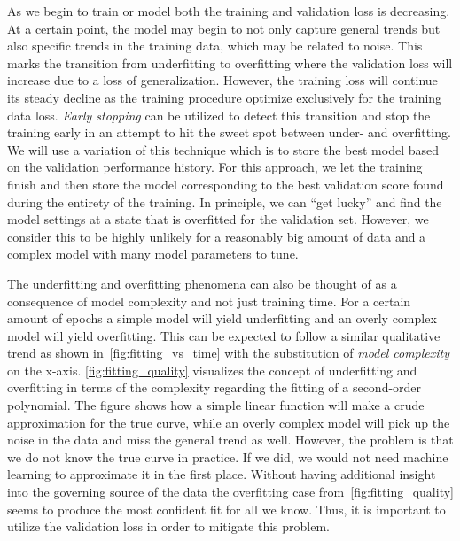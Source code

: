 As we begin to train or model both the training and validation loss is
decreasing. At a certain point, the model may begin to not only capture general
trends but also specific trends in the training data, which may be related to
noise. This marks the transition from underfitting to overfitting where the
validation loss will increase due to a loss of generalization. However, the
training loss will continue its steady decline as the training procedure
optimize exclusively for the training data loss. \textit{Early stopping} can be
utilized to detect this transition and stop the training early in an attempt to
hit the sweet spot between under- and overfitting. We will use a variation of
this technique which is to store the best model based on the validation
performance history. For this approach, we let the training finish and then
store the model corresponding to the best validation score found during the
entirety of the training. In principle, we can ``get lucky'' and find the model
settings at a state that is overfitted for the validation set. However, we
consider this to be highly unlikely for a reasonably big amount of data and a
complex model with many model parameters to tune.


The underfitting and overfitting phenomena can also be thought of as a
consequence of model complexity and not just training time. For a certain amount
of epochs a simple model will yield underfitting and an overly complex model
will yield overfitting. This can be expected to follow a similar qualitative
trend as shown in~\cref{fig:fitting_vs_time} with the substitution of
\textit{model complexity} on the x-axis. \cref{fig:fitting_quality} visualizes
the concept of underfitting and overfitting in terms of the complexity regarding
the fitting of a second-order polynomial. The figure shows how a simple linear
function will make a crude approximation for the true curve, while an overly
complex model will pick up the noise in the data and miss the general trend as
well. However, the problem is that we do not know the true curve in practice. If
we did, we would not need machine learning to approximate it in the first place.
Without having additional insight into the governing source of the data the
overfitting case from~\cref{fig:fitting_quality} seems to produce the most confident fit for all we know. Thus, it is important to utilize the validation loss in order to mitigate this problem. 




